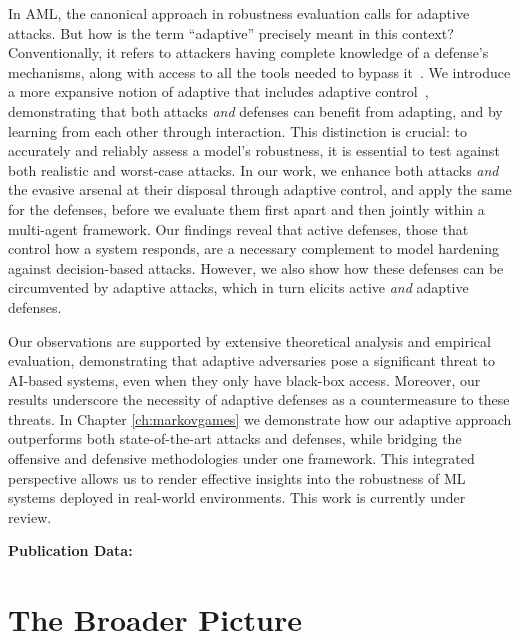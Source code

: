 In \gls{AML}, the canonical approach in robustness evaluation calls for adaptive attacks.
But how is the term ``adaptive'' precisely meant in this context?
Conventionally, it refers to attackers having complete knowledge of a defense's mechanisms, along with access to all the tools needed to bypass it~\cite{tramer2020adaptive}.
We introduce a more expansive notion of adaptive that includes adaptive control~\cite{aastrom2013adaptive}, demonstrating that both attacks \textit{and} defenses can benefit from adapting, and by learning from each other through interaction.
This distinction is crucial: to accurately and reliably assess a model's robustness, it is essential to test against both realistic and worst-case attacks.
In our work, we enhance both attacks \emph{and} the evasive arsenal at their disposal through adaptive control, and apply the same for the defenses, before we evaluate them first apart and then jointly within a multi-agent framework.
Our findings reveal that active defenses, those that control how a system responds, are a necessary complement to model hardening against decision-based attacks.
However, we also show how these defenses can be circumvented by adaptive attacks, which in turn elicits active \emph{and} adaptive defenses.

Our observations are supported by extensive theoretical analysis and empirical evaluation, demonstrating that adaptive adversaries pose a significant threat to AI-based systems, even when they only have black-box access.
Moreover, our results underscore the necessity of adaptive defenses as a countermeasure to these threats.
In Chapter \ref{ch:markovgames} we demonstrate how our adaptive approach outperforms both state-of-the-art attacks and defenses, while bridging the offensive and defensive methodologies under one framework.
This integrated perspective allows us to render effective insights into the robustness of ML systems deployed in real-world environments.
This work is currently under review.

\textbf{Publication Data:} 

\section{The Broader Picture}

